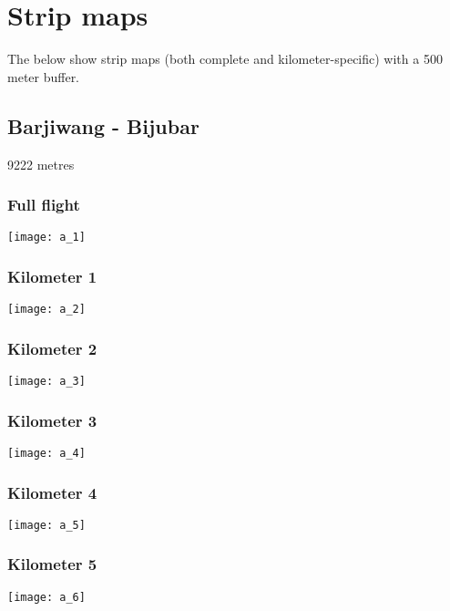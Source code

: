 \documentclass[]{article}
\begin{document}
\newpage

\section{Strip maps}\label{strip-maps}

The below show strip maps (both complete and kilometer-specific) with a
500 meter buffer.

\newpage

\subsection{Barjiwang - Bijubar}\label{barjiwang---bijubar}

9222 metres

\subsubsection{Full flight}\label{full-flight}

\texttt{[image: a\_1]}

\subsubsection{Kilometer 1}\label{kilometer-1}

\texttt{[image: a\_2]}

\subsubsection{Kilometer 2}\label{kilometer-2}

\texttt{[image: a\_3]}

\subsubsection{Kilometer 3}\label{kilometer-3}

\texttt{[image: a\_4]}

\subsubsection{Kilometer 4}\label{kilometer-4}

\texttt{[image: a\_5]}

\subsubsection{Kilometer 5}\label{kilometer-5}

\texttt{[image: a\_6]}
\end{document}
